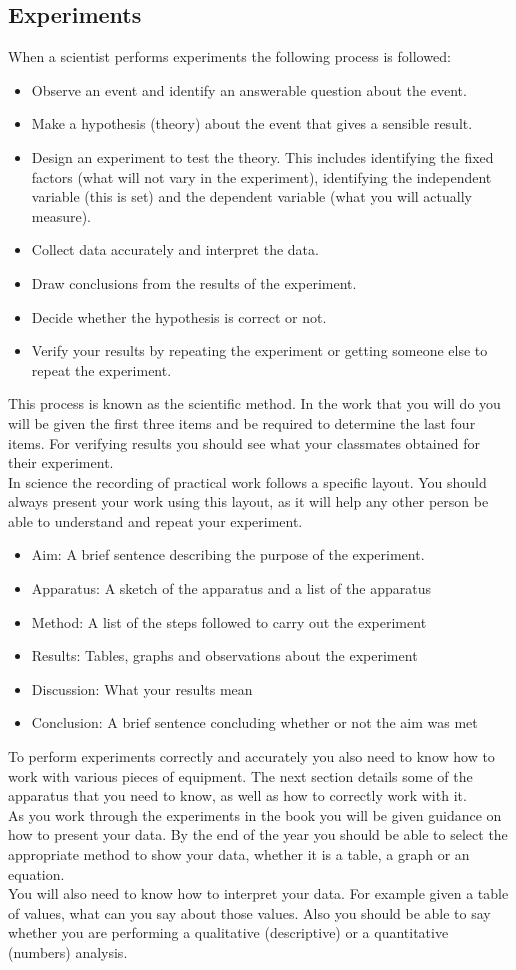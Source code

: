 \subsection*{Experiments}
When a scientist performs experiments the following process is followed:
\begin{itemize}
\item Observe an event and identify an answerable question about the event.
\item Make a hypothesis (theory) about the event that gives a sensible result.
\item Design an experiment to test the theory. This includes identifying the fixed factors (what will not vary in the experiment), identifying the independent variable (this is set) and the dependent variable (what you will actually measure).
\item Collect data accurately and interpret the data.
\item Draw conclusions from the results of the experiment.
\item Decide whether the hypothesis is correct or not.
\item Verify your results by repeating the experiment or getting someone else to repeat the experiment.
\end{itemize}
This process is known as the scientific method. In the work that you will do you will be given the first three items and be required to determine the last four items. For verifying results you should see what your classmates obtained for their experiment. \\
In science the recording of practical work follows a specific layout. You should always present your work using this layout, as it will help any other person be able to understand and repeat your experiment.
\begin{itemize}
\item Aim: A brief sentence describing the purpose of the experiment.
\item Apparatus: A sketch of the apparatus and a list of the apparatus
\item Method: A list of the steps followed to carry out the experiment
\item Results: Tables, graphs and observations about the experiment
\item Discussion: What your results mean
\item Conclusion: A brief sentence concluding whether or not the aim was met
\end{itemize}
To perform experiments correctly and accurately you also need to know how to work with various pieces of equipment. The next section details some of the apparatus that you need to know, as well as how to correctly work with it.\\
As you work through the experiments in the book you will be given guidance on how to present your data. By the end of the year you should be able to select the appropriate method to show your data, whether it is a table, a graph or an equation.\\
You will also need to know how to interpret your data. For example given a table of values, what can you say about those values. Also you should be able to say whether you are performing a qualitative (descriptive) or a quantitative (numbers) analysis. 
